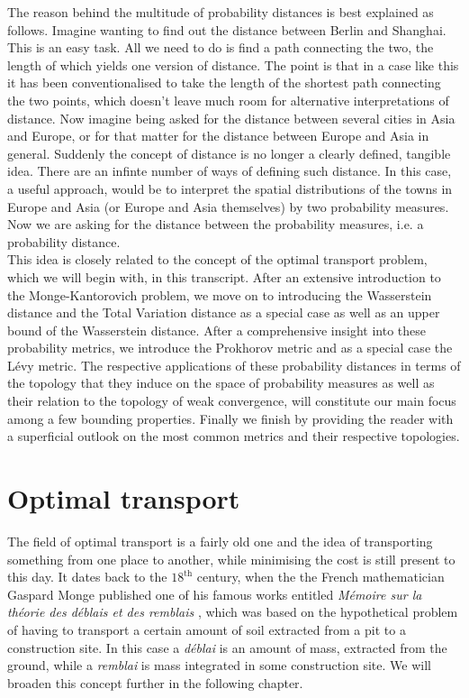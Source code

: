 \documentclass[11pt,a4paper]{article}
\begin{document}
The reason behind the multitude of  probability distances is best explained as follows. Imagine wanting to find out the distance between Berlin and Shanghai. This is an easy task. All we need to do is find a path connecting the two, the length of which yields one version of distance. The point is that in a case like this it has been conventionalised to take the length of the shortest path connecting the two points, which doesn't leave much room for alternative interpretations of distance. Now imagine being asked for the distance between several cities in Asia and Europe, or for that matter for the distance between Europe and Asia in general. Suddenly the concept of distance is no longer a clearly defined, tangible idea. There are an infinte number of ways of defining such distance. In this case, a useful approach, would be to interpret the spatial distributions of the towns in Europe and Asia (or Europe and Asia themselves) by two probability measures. Now we are asking for the distance between the probability measures, i.e. a probability distance.\vspace{1em}\\
This idea is closely related to the concept of the optimal transport problem, which we will begin with, in this transcript. After an extensive introduction to the Monge-Kantorovich problem, we move on to introducing the Wasserstein distance and the Total Variation distance as a special case as well as an upper bound of the Wasserstein distance. After a comprehensive insight into these probability metrics, we introduce the Prokhorov metric and as a special case the Lévy metric. The respective applications of these probability distances in terms of the topology that they induce on the space of probability measures as well as their relation to the topology of weak convergence, will constitute our main focus among a few bounding properties. Finally we finish by providing the reader with a superficial outlook on the most common metrics and their respective topologies.\newpage
\section{Optimal transport}
The field of optimal transport is a fairly old one and the idea of transporting something from one place to another, while minimising the cost is still present to this day. It dates back to the $18^{\text{th}}$ century, when the the French mathematician Gaspard Monge published one of his famous works entitled {\sl Mémoire sur la théorie des déblais et des remblais} \cite{Monge}, which was based on the hypothetical problem of having to transport a certain amount of soil extracted from a pit to a construction site. In this case a {\sl déblai} is an amount of mass, extracted from the ground, while a {\sl remblai} is mass integrated in some construction site. We will broaden this concept further in the following chapter.
\end{document}

